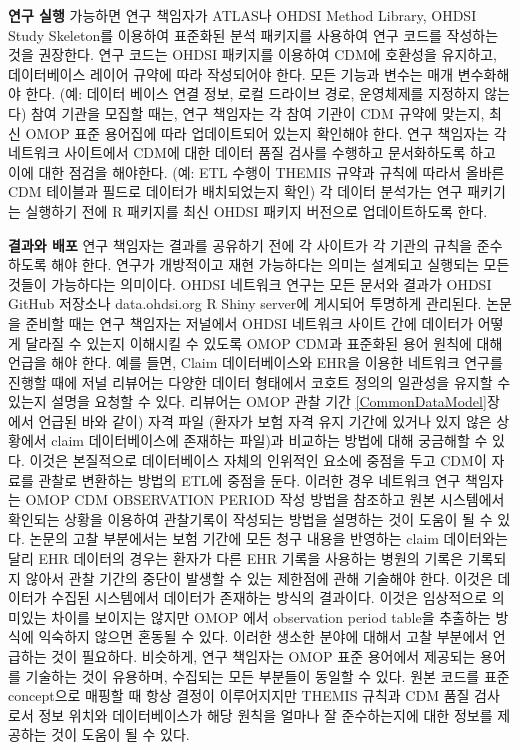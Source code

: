 \documentclass[11pt]{book}
\theoremstyle{definition}
\theoremstyle{definition}
\theoremstyle{definition}
\theoremstyle{remark}
\begin{document}
\textbf{연구 실행} 가능하면 연구 책임자가 ATLAS나 OHDSI Method Library,
OHDSI Study Skeleton를 이용하여 표준화된 분석 패키지를 사용하여 연구
코드를 작성하는 것을 권장한다. 연구 코드는 OHDSI 패키지를 이용하여 CDM에
호환성을 유지하고, 데이터베이스 레이어 규약에 따라 작성되어야 한다. 모든
기능과 변수는 매개 변수화해야 한다. (예: 데이터 베이스 연결 정보, 로컬
드라이브 경로, 운영체제를 지정하지 않는다) 참여 기관을 모집할 때는, 연구
책임자는 각 참여 기관이 CDM 규약에 맞는지, 최신 OMOP 표준 용어집에 따라
업데이트되어 있는지 확인해야 한다. 연구 책임자는 각 네트워크 사이트에서
CDM에 대한 데이터 품질 검사를 수행하고 문서화하도록 하고 이에 대한
점검을 해야한다. (예: ETL 수행이 THEMIS 규약과 규칙에 따라서 올바른 CDM
테이블과 필드로 데이터가 배치되었는지 확인) 각 데이터 분석가는 연구
패키기는 실행하기 전에 R 패키지를 최신 OHDSI 패키지 버전으로
업데이트하도록 한다.

\textbf{결과와 배포} 연구 책임자는 결과를 공유하기 전에 각 사이트가 각
기관의 규칙을 준수하도록 해야 한다. 연구가 개방적이고 재현 가능하다는
의미는 설계되고 실행되는 모든 것들이 가능하다는 의미이다. OHDSI 네트워크
연구는 모든 문서와 결과가 OHDSI GitHub 저장소나 data.ohdsi.org R Shiny
server에 게시되어 투명하게 관리된다. 논문을 준비할 때는 연구 책임자는
저널에서 OHDSI 네트워크 사이트 간에 데이터가 어떻게 달라질 수 있는지
이해시킬 수 있도록 OMOP CDM과 표준화된 용어 원칙에 대해 언급을 해야
한다. 예를 들면, Claim 데이터베이스와 EHR을 이용한 네트워크 연구를
진행할 때에 저널 리뷰어는 다양한 데이터 형태에서 코호트 정의의 일관성을
유지할 수 있는지 설명을 요청할 수 있다. 리뷰어는 OMOP 관찰 기간
\ref{CommonDataModel}장에서 언급된 바와 같이) 자격 파일 (환자가 보험
자격 유지 기간에 있거나 있지 않은 상황에서 claim 데이터베이스에 존재하는
파일)과 비교하는 방법에 대해 궁금해할 수 있다. 이것은 본질적으로
데이터베이스 자체의 인위적인 요소에 중점을 두고 CDM이 자료를 관찰로
변환하는 방법의 ETL에 중점을 둔다. 이러한 경우 네트워크 연구 책임자는
OMOP CDM OBSERVATION PERIOD 작성 방법을 참조하고 원본 시스템에서
확인되는 상황을 이용하여 관찰기록이 작성되는 방법을 설명하는 것이 도움이
될 수 있다. 논문의 고찰 부분에서는 보험 기간에 모든 청구 내용을 반영하는
claim 데이터와는 달리 EHR 데이터의 경우는 환자가 다른 EHR 기록을
사용하는 병원의 기록은 기록되지 않아서 관찰 기간의 중단이 발생할 수 있는
제한점에 관해 기술해야 한다. 이것은 데이터가 수집된 시스템에서 데이터가
존재하는 방식의 결과이다. 이것은 임상적으로 의미있는 차이를 보이지는
않지만 OMOP 에서 observation period table을 추출하는 방식에 익숙하지
않으면 혼동될 수 있다. 이러한 생소한 분야에 대해서 고찰 부분에서
언급하는 것이 필요하다. 비슷하게, 연구 책임자는 OMOP 표준 용어에서
제공되는 용어를 기술하는 것이 유용하며, 수집되는 모든 부분들이 동일할 수
있다. 원본 코드를 표준 concept으로 매핑할 때 항상 결정이 이루어지지만
THEMIS 규칙과 CDM 품질 검사로서 정보 위치와 데이터베이스가 해당 원칙을
얼마나 잘 준수하는지에 대한 정보를 제공하는 것이 도움이 될 수 있다.
\end{document}
